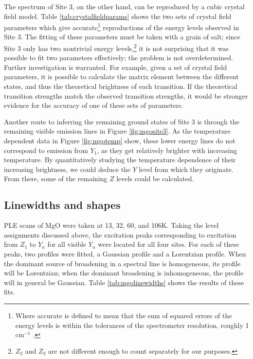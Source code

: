 \documentclass[12pt]{report}
\newcommand{\wn}[1][ ]{cm$^{-1}$#1}
\begin{document}
The spectrum of Site 3, on the other hand, can be reproduced by a cubic crystal field model. Table \ref{tab:crystalfieldparams} shows the two sets of crystal field parameters which give accurate\footnote{Where accurate is defined to mean that the sum of squared errors of the energy levels is within the tolerances of the spectrometer resolution, roughly 1 \wn.} reproductions of the energy levels observed in Site 3. The fitting of these parameters must be taken with a grain of salt; since Site 3 only has two nontrivial energy levels,\footnote{$Z_{2}$ and $Z_{3}$ are not different enough to count separately for our purposes.} it is not surprising that it was possible to fit two parameters effectively; the problem is not overdetermined. Further investigation is warranted. For example, given a set of crystal field parameters, it is possible to calculate the matrix element between the different states, and thus the theoretical brightness of each transition. If the theoretical transition strengths match the observed transition strengths, it would be stronger evidence for the accuracy of one of these sets of parameters.

Another route to inferring the remaining ground states of Site 3 is through the remaining visible emission lines in Figure \ref{fig:mgosite3}. As the temperature dependent data in Figure \ref{fig:mgotemp} show, these lower energy lines do not correspond to emission from $Y_{1}$, as they get relatively brighter with increasing temperature. By quantitatively studying the temperature dependence of their increasing brightness, we could deduce the $Y$ level from which they originate. From there, some of the remaining $Z$ levels could be calculated.


\subsection{Linewidths and shapes}
\label{sec:linewidths-shapes}
PLE scans of MgO were taken at 13, 32, 60, and 106K. Taking the level assignments discussed above, the excitation peaks corresponding to excitation from $Z_{1}$ to $Y_{n}$ for all visible $Y_{n}$ were located for all four sites. For each of these peaks, two profiles were fitted, a Gaussian profile and a Lorentzian profile. When the dominant source of broadening in a spectral line is homogeneous, its profile will be Lorentzian; when the dominant broadening is inhomogeneous, the profile will in general be Gaussian. Table \ref{tab:mgolinewidths} shows the results of these fits.
\end{document}
